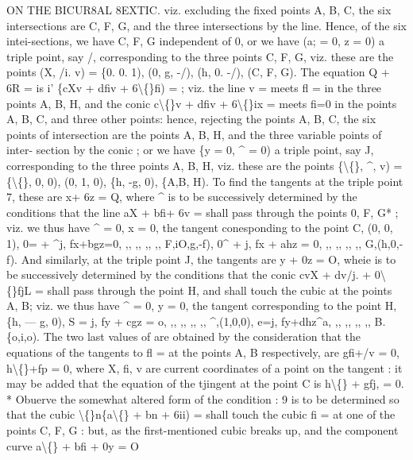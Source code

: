 \documentclass[12pt,a4paper]{article}
\begin{document}
ON THE BICUR8AL 8EXTIC.
viz.
excluding the
fixed
points A, B,
C, the
six
intersections are
C, F,
G, and
the three
intersections by the
line.
Hence,
of
the
six
intei-sections, we
have
C, F, G independent
of
0,
or we
have
(a; = 0, z = 0)
a
triple
point, say
/,
corresponding
to
the
three
points
C, F, G,
viz.
these are the points
(X,
/i.
v) = \{0.
0.
1),
(0, g, -/),
(h,
0. -/),
(C,
F,
G).
The equation Q + 6R =
is
i' \{cXv + dfiv + 6\textbackslash\{\}fi) =
;
viz.
the
line
v =
meets
fl =
in
the
three
points
A,
B,
H,
and
the
conic
c\textbackslash\{\}v + dfiv + 6\textbackslash\{\}ix =
meets fi=0
in
the
points A, B,
C, and
three
other
points:
hence,
rejecting
the
points
A,
B,
C,
the
six
points
of
intersection
are
the
points
A, B, H, and
the
three
variable
points of
inter-
section by the
conic
;
or we
have
\{y = 0,
\textasciicircum{} = 0)
a
triple
point, say J, corresponding to
the three points A, B, H,
viz.
these
are
the
points
\{\textbackslash\{\},
\textasciicircum{},
v) = \{\textbackslash\{\},
0,
0),
(0,
1,
0),
\{h, -g,
0),
\{A,B, H).
To
find
the tangents
at
the
triple
point
7,
these
are x+ 6z = Q, where \textasciicircum{}
is
to be
successively
determined
by
the
conditions
that
the
line
aX + bfi+ 6v =
shall
pass
through
the
points
0, F, G*
;
viz. we
thus
have
\textasciicircum{} = 0,
x = 0, the tangent conesponding to the point
C,
(0,
0,
1),
0= + \textasciicircum{}j,
fx+bgz=0,
,,
,,
,,
,,
F,iO,g,-f),
0\textasciicircum{} + j,
fx + ahz = 0,
,,
,,
,,
,,
G,(h,0,-f).
And
similarly,
at
the
triple
point
J,
the
tangents
are
y + 0z = O,
wheie
is
to
be
successively determined
by the
conditions
that
the
conic cvX + dv/j. + 0\textbackslash\{\}fjL =
shall
pass
through the point H, and
shall touch the cubic at the points A, B;
viz. we thus have
\textasciicircum{} = 0,
y = 0, the tangent corresponding to the point H,
\{h, --- g,
0),
S = j,
fy + cgz = o,
,,
,,
,,
,,
\textasciicircum{},(1,0,0),
e=j,
fy+dhz\textasciicircum{}a,
,,
,,
,,
,,
B.\{o,i,o).
The
two
last
values
of
are
obtained
by the
consideration
that the equations of
the
tangents
to
fl =
at
the
points
A, B
respectively,
are
gfi+/v = 0, h\textbackslash\{\}+fp = 0,
where
X,
fi,
v
are
current
coordinates
of a
point
on
the
tangent
:
it
may
be
added
that the equation of the tjingent at the point C
is h\textbackslash\{\} + gfj, = 0.
*
Obuerve
the
somewhat
altered
form
of
the
condition
:
9
is
to
be
determined
so
that
the
cubic
\textbackslash\{\}n\{a\textbackslash\{\} + bn + 6ii) =
shall
touch
the
cubic
fi =
at
one
of
the
points
C,
F,
G
:
but,
as
the
first-mentioned
cubic
breaks
up,
and
the component
curve
a\textbackslash\{\} + bfi + 0y = O
\end{document}
